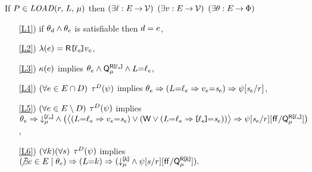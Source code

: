 \noindent
If $\aPS \in \sLOAD[\amode]{\aReg}{\cExp}$ then
$(\exists\ell:E\mathbin\rightarrow\mathcal{V})$
$(\exists v:E\mathbin\rightarrow\mathcal{V})$
$(\exists\theta:E\mathbin\rightarrow\Phi)$
\begin{enumerate}
\item[\ref{L1})] if $\theta_d\land\theta_e$ is satisfiable then $d=e$,
\item[\ref{L2})] $\labelingAct(\aEv) = \DRREF{\cVal_\aEv}{\aVal_\aEv}$,
\item[\ref{L3})] $\kappa(e)$ implies
  \begin{math}
    \theta_e
    \land \smash{\mathsf{Q}_{\mu}^{\mathsf{R}\mkern-2mu\texttt{[}\mkern-2mu\ell_e \mkern-2mu\texttt{]}\mkern-2mu}}
    \land L{=}\ell_e
  \end{math},
\item[\ref{L4})]
  \begin{math}
    (\forall e\in E\cap D)
  \end{math}
  $\aTr{\bEvs}{\bForm}$ implies
  \begin{math}
    \theta_e
    \Rightarrow (L{=}\ell_e\Rightarrow v_e{=}\mathit{s}_{e})
    \Rightarrow \psi[\mathit{s}_{e}/r]
  \end{math},
\item[\ref{L5})] 
  \begin{math}
    (\forall e\in E\setminus D)
  \end{math}
  $\aTr{\cEvs}{\bForm}$ implies
  \begin{math}
    \theta_e 
    \Rightarrow
    \mathord{\downarrow^{\mkern-2mu\texttt{[}\mkern-2mu\ell_e \mkern-2mu\texttt{]}\mkern-2mu}_{\mu}}
    \land
    \bigl(
      \bigl\langle
        (L{=}\ell_e\Rightarrow v_e{=}\mathit{s}_{e})
        \lor
        (
          \mathsf{W}\lor
          (L{=}\ell_e\Rightarrow\mkern-2mu\texttt{[}\mkern-2mu\ell_e \mkern-2mu\texttt{]}\mkern-2mu{=}\mathit{s}_{e})
        )
      \bigr\rangle
      \Rightarrow
      \psi
      [\mathit{s}_{e}/r]
      [\mkern.6mu\mathsf{ff}\mkern.6mu/\smash{\mathsf{Q}_{\mu}^{\mathsf{R}\mkern-2mu\texttt{[}\mkern-2mu\ell_e \mkern-2mu\texttt{]}\mkern-2mu}}]
    \bigr)    
  \end{math},
\item[\ref{L6})] 
  \begin{math}
    (\forall k)
    (\forall s)
  \end{math}
  $\aTr{\dEvs}{\bForm}$  implies 
  \begin{math}
    (\!\not\exists e\in E \mid \theta_e)
    \Rightarrow (L{=}k)
    \Rightarrow (        
      \mathord{\downarrow^{\mkern-2mu\texttt{[}\mkern-2muk \mkern-2mu\texttt{]}\mkern-2mu}_{\mu}} \land
      \psi
      [s/r]
      [\mkern.6mu\mathsf{ff}\mkern.6mu/\smash{\mathsf{Q}_{\mu}^{\mathsf{R}\mkern-2mu\texttt{[}\mkern-2muk \mkern-2mu\texttt{]}\mkern-2mu}}]
    ).
  \end{math}
\end{enumerate}  
